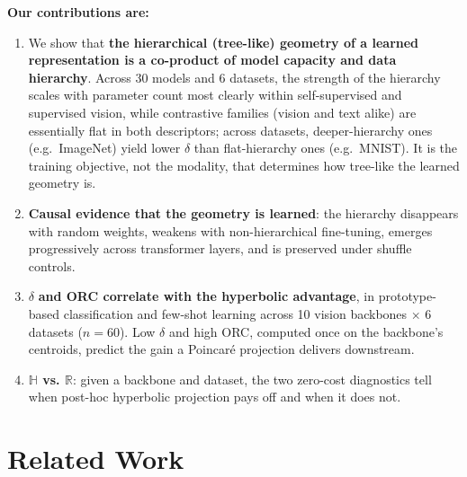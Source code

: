 \documentclass{article}
\begin{document}
\textbf{Our contributions are:}
\begin{enumerate}[topsep=0pt,itemsep=1pt,leftmargin=*]
\item We show that \textbf{the hierarchical (tree-like) geometry of a learned representation is a co-product of model capacity and data hierarchy}. Across 30 models and 6 datasets, the strength of the hierarchy scales with parameter count most clearly within self-supervised and supervised vision, while contrastive families (vision and text alike) are essentially flat in both descriptors; across datasets, deeper-hierarchy ones (e.g.\ ImageNet) yield lower $\delta$ than flat-hierarchy ones (e.g.\ MNIST). It is the training objective, not the modality, that determines how tree-like the learned geometry is.
\item \textbf{Causal evidence that the geometry is learned}: the hierarchy disappears with random weights, weakens with non-hierarchical fine-tuning, emerges progressively across transformer layers, and is preserved under shuffle controls.
\item $\delta$ \textbf{and ORC correlate with the hyperbolic advantage}, in prototype-based classification and few-shot learning across 10 vision backbones $\times$ 6 datasets ($n = 60$). Low $\delta$ and high ORC, computed once on the backbone's centroids, predict the gain a Poincar\'{e} projection delivers downstream.
\item \textbf{$\mathbb{H}$ vs. $\mathbb{R}$}: given a backbone and dataset, the two zero-cost diagnostics tell when post-hoc hyperbolic projection pays off and when it does not.
\end{enumerate}



\section{Related Work}
\label{sec:related}
\end{document}
